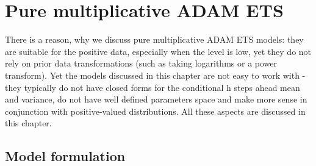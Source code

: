 \documentclass[
]{book}
\theoremstyle{definition}
\theoremstyle{definition}
\theoremstyle{definition}
\theoremstyle{definition}
\theoremstyle{remark}
\begin{document}
\hypertarget{pure-multiplicative-adam-ets}{%
\chapter{Pure multiplicative ADAM ETS}\label{pure-multiplicative-adam-ets}}

There is a reason, why we discuss pure multiplicative ADAM ETS models: they are suitable for the positive data, especially when the level is low, yet they do not rely on prior data transformations (such as taking logarithms or a power transform). Yet the models discussed in this chapter are not easy to work with - they typically do not have closed forms for the conditional h steps ahead mean and variance, do not have well defined parameters space and make more sense in conjunction with positive-valued distributions. All these aspects are discussed in this chapter.

\hypertarget{ADAMETSPureMultiplicative}{%
\section{Model formulation}\label{ADAMETSPureMultiplicative}}
\end{document}
